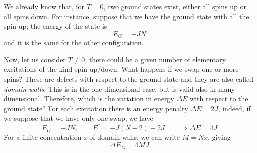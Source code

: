 \documentclass[../../Main/Main.tex]{subfiles}
\begin{document}
We already know that, for \( T=0 \), two ground states exist, either all spins up or all spins down.
For instance, suppose that we have the ground state with all the spin up; the energy of the state is
\begin{equation}
   E_G = -JN
\end{equation}
and it is the same for the other configuration.

Now, let us consider \( T \neq 0 \), there could be a given number of elementary excitations of the kind spin up/down. What happens if we swap one or more spins?
These are defects with respect to the ground state and they are also called \emph{domain walls}.
This is in the one dimensional case, but is valid also in many dimensional. Therefore, which is the variation in energy \( \Delta E \) with respect to the ground state?
For each excitation there is an energy penalty \( \Delta E = 2J \), indeed, if we suppose that we have only one swap, we have 
\begin{equation*}
  E_G = -JN, \qquad E^* = -J(N-2) +2J \qquad \Rightarrow \Delta E = 4J
\end{equation*}
For a finite concentration \emph{x} of domain walls, we can write \(   M = Nx \), giving
\begin{equation}
  \Delta E_M = 4MJ
\end{equation}
\end{document}
